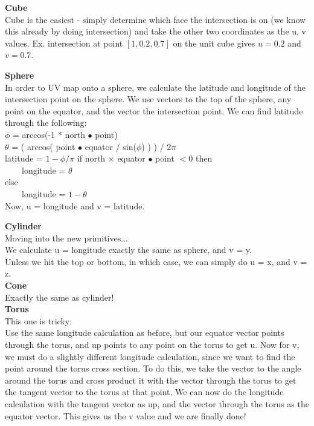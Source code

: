 \documentclass {article}
\begin{document}
\textbf{Cube}\\
Cube is the easiest - simply determine which face the intersection is on (we
know this already by doing intersection) and take the other two coordinates as
the u, v values.  Ex. intersection at point $[1, 0.2, 0.7]$ on the unit cube
gives $u = 0.2$ and $v = 0.7$.

\textbf{Sphere}\\
In order to UV map onto a sphere, we calculate the latitude and longitude of the
intersection point on the sphere.  We use vectors to the top of the sphere, any
point on the equator, and the vector the intersection point.  We can find
latitude through the following:\\
$\phi$ = arccos(-1 * north $\bullet$ point)\\
$\theta$ = ( arccos( point $\bullet$ equator / sin($\phi$) ) ) / $2\pi$\\
latitude = $1 - \phi / \pi$
if north $\times$ equator $\bullet$ point $< 0$ then\\
\ \ \ \ longitude = $\theta$\\
else\\
\ \ \ \ longitude = $1 - \theta$\\
Now, u = longitude and v = latitude.

\textbf{Cylinder}\\
Moving into the new primitives...\\
We calculate u = longitude exactly the same as sphere, and v = y.\\
Unless we hit the top or bottom, in which case, we can simply do u = x, and v =
z.\\

\textbf{Cone}\\
Exactly the same as cylinder!\\

\textbf{Torus}\\
This one is tricky:\\
Use the same longitude calculation as before, but our equator vector points
through the torus, and up points to any point on the torus to get u.  Now for
v, we must do a slightly different longitude calculation, since we want to find
the point around the torus cross section.  To do this, we take the vector to the
angle around the torus and cross product it with the vector through the torus to
get the tangent vector to the torus at that point.  We can now do the longitude
calculation with the tangent vector as up, and the vector through the torus as
the equator vector.  This gives us the v value and we are finally done!
\end{document}
